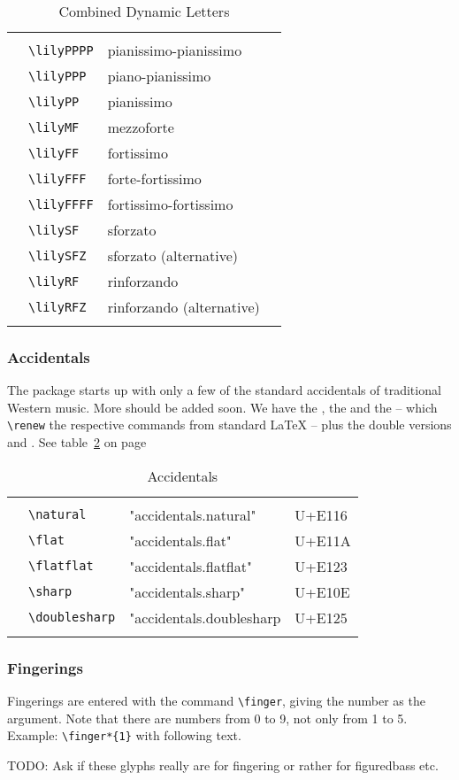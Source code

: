 \documentclass{article}
\newcommand*{\cmd}[1]{\texttt{\textbackslash #1}}
\newcommand{\tmpCaption}{} %
\newcommand{\tmpLabel}{}
\newenvironment{reftable}[2]
	{%
		\renewcommand{\tmpCaption}{#1}
		\renewcommand{\tmpLabel}{#2}
		\begin{table}[ht]
		\begin{center}
		\begin{tabular}[t]{llll}
		\hline
		&\\
	}
	{%
		&\\
		\hline
		\end{tabular}
		\caption{\tmpCaption}
		\label{table:\tmpLabel}
		\end{center}
		\end{table}
	}
\begin{document}
\begin{reftable}{Combined Dynamic Letters}{combinedDynLetters}
\lilyPPPP* & \cmd{lilyPPPP} & pianissimo-pianissimo\\
\lilyPPP* & \cmd{lilyPPP} & piano-pianissimo\\
\lilyPP* & \cmd{lilyPP} & pianissimo\\
\lilyMF* & \cmd{lilyMF} & mezzoforte\\
\lilyFF* & \cmd{lilyFF} & fortissimo\\
\lilyFFF* & \cmd{lilyFFF} & forte-fortissimo\\
\lilyFFFF* & \cmd{lilyFFFF} & fortissimo-fortissimo\\

\lilySF* & \cmd{lilySF} & sforzato\\
\lilySFZ* & \cmd{lilySFZ} & sforzato (alternative)\\
\lilyRF* & \cmd{lilyRF} & rinforzando\\
\lilyRFZ* & \cmd{lilyRFZ} & rinforzando (alternative)\\

\end{reftable}

\subsubsection{Accidentals}
The package starts up with only a few of the standard accidentals of traditional Western music. More should be added soon. We have the \natural, the \flat* and the \sharp* -- which \cmd{renew} the respective commands from standard \LaTeX{} -- plus the double versions \flatflat* and \doublesharp. See table~\ref{table:accidentals} on page~\pageref{table:accidentals}

\begin{reftable}{Accidentals}{accidentals}
\natural & \cmd{natural} & "accidentals.natural" & U+E116\\
\flat & \cmd{flat} & "accidentals.flat" & U+E11A\\
\flatflat & \cmd{flatflat} & "accidentals.flatflat" & U+E123\\
\sharp & \cmd{sharp} & "accidentals.sharp" & U+E10E\\
\doublesharp & \cmd{doublesharp} & "accidentals.doublesharp & U+E125\\
\end{reftable}

\subsubsection{Fingerings}
Fingerings are entered with the command \cmd{finger}, giving the number as the argument. Note that there are numbers from 0 to 9, not only from 1 to 5. Example: \cmd{finger*\{1\}}
with following text.

TODO: Ask if these glyphs really are for fingering or rather for figuredbass etc.
\end{document}
